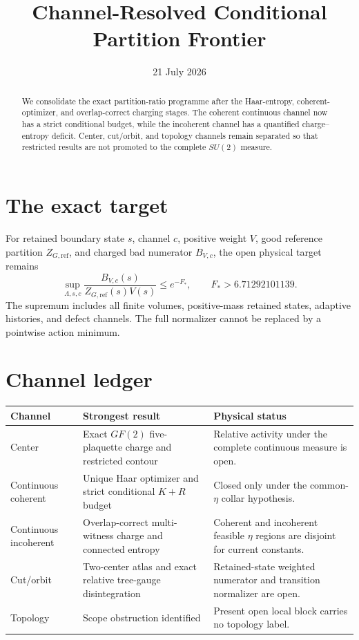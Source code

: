 \documentclass[11pt]{article}
\title{Channel-Resolved Conditional Partition Frontier}
\author{}
\date{21 July 2026}
\begin{document}
\maketitle

\begin{abstract}
We consolidate the exact partition-ratio programme after the Haar-entropy,
coherent-optimizer, and overlap-correct charging stages.  The coherent
continuous channel now has a strict conditional budget, while the incoherent
channel has a quantified charge--entropy deficit.  Center, cut/orbit, and
topology channels remain separated so that restricted results are not promoted
to the complete $SU(2)$ measure.
\end{abstract}

\section{The exact target}

For retained boundary state $s$, channel $c$, positive weight $V$, good
reference partition $Z_{G,\mathrm{ref}}$, and charged bad numerator $B_{V,c}$,
the open physical target remains
\[
 \sup_{\Lambda,s,c}
 \frac{B_{V,c}(s)}{Z_{G,\mathrm{ref}}(s)V(s)}
 \le e^{-F_*},
 \qquad F_*>6.71292101139.
\]
The supremum includes all finite volumes, positive-mass retained states,
adaptive histories, and defect channels.  The full normalizer cannot be
replaced by a pointwise action minimum.

\section{Channel ledger}

\begin{center}
\small
\begin{tabular}{>{\raggedright\arraybackslash}p{.20\linewidth}
                >{\raggedright\arraybackslash}p{.32\linewidth}
                >{\raggedright\arraybackslash}p{.35\linewidth}}
\toprule
Channel & Strongest result & Physical status\\
\midrule
Center & Exact $GF(2)$ five-plaquette charge and restricted contour & Relative activity under the complete continuous measure is open.\\
Continuous coherent & Unique Haar optimizer and strict conditional $K+R$ budget & Closed only under the common-$\eta$ collar hypothesis.\\
Continuous incoherent & Overlap-correct multi-witness charge and connected entropy & Coherent and incoherent feasible $\eta$ regions are disjoint for current constants.\\
Cut/orbit & Two-center atlas and exact relative tree-gauge disintegration & Retained-state weighted numerator and transition normalizer are open.\\
Topology & Scope obstruction identified & Present open local block carries no topology label.\\
\bottomrule
\end{tabular}
\end{center}
\end{document}
